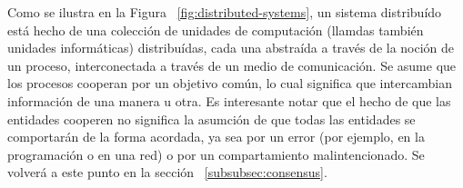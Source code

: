 Como se ilustra en la Figura ~\ref{fig:distributed-systems}, un sistema distribuído está hecho de una
colección de unidades de computación (llamdas también unidades informáticas) distribuídas, cada una
abstraída a través de la noción de un proceso, interconectada a través de un medio de comunicación.
Se asume que los procesos cooperan por un objetivo común, lo cual significa que intercambian
información de una manera u otra. Es interesante notar que el hecho de que las entidades
cooperen no significa la asumción de que todas las entidades se comportarán de la forma
acordada, ya sea por un error (por ejemplo, en la programación o en una red) o por un compartamiento
malintencionado. Se volverá a este punto en la sección ~\ref{subsubsec:consensus}.


